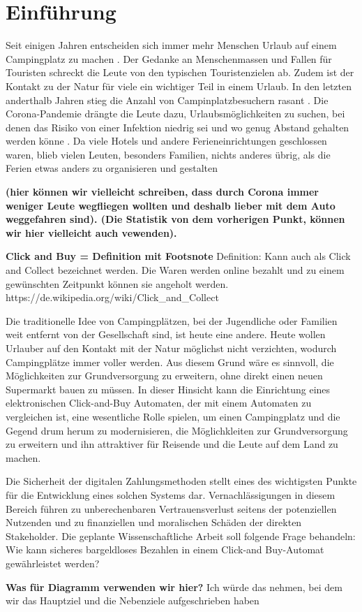 \section{Einführung}


Seit einigen Jahren entscheiden sich immer mehr Menschen Urlaub auf einem Campingplatz 
zu machen \cite{periodical:ANST}. Der Gedanke an Menschenmassen und Fallen für Touristen 
schreckt die Leute von den typischen Touristenzielen ab. Zudem ist der Kontakt zu der Natur für 
viele ein wichtiger Teil in einem Urlaub. In den letzten anderthalb Jahren stieg die Anzahl von
Campinplatzbesuchern rasant \cite{periodical:UBST}. Die Corona-Pandemie drängte die Leute dazu, 
Urlaubsmöglichkeiten zu suchen, bei denen das Risiko von einer Infektion niedrig sei und wo genug 
Abstand gehalten werden könne \cite{periodical:AUST}. Da viele Hotels und andere Ferieneinrichtungen 
geschlossen waren, blieb vielen Leuten, besonders Familien, nichts anderes übrig, als die Ferien 
etwas anders zu organisieren und gestalten 


\textbf{(hier können wir vielleicht schreiben, dass durch Corona immer weniger Leute wegfliegen wollten und deshalb lieber
mit dem Auto weggefahren sind). (Die Statistik von dem vorherigen Punkt, können wir hier vielleicht auch vewenden).}


\textbf{Click and Buy = Definition mit Footsnote}
Definition: Kann auch als Click and Collect bezeichnet werden. Die Waren werden online bezahlt und zu einem gewünschten Zeitpunkt 
können sie angeholt werden. https://de.wikipedia.org/wiki/Click_and_Collect


Die traditionelle Idee von Campingplätzen, bei der Jugendliche oder Familien weit entfernt von der 
Gesellschaft sind, ist heute eine andere. Heute wollen Urlauber auf den Kontakt mit der Natur
möglichst nicht verzichten, wodurch Campingplätze immer voller werden. Aus diesem Grund wäre es
sinnvoll, die Möglichkeiten zur Grundversorgung zu erweitern, ohne direkt einen neuen Supermarkt
bauen zu müssen. In dieser Hinsicht kann die Einrichtung eines elektronischen Click-and-Buy
Automaten, der mit einem Automaten zu vergleichen ist, eine wesentliche Rolle spielen, um 
einen Campingplatz und die Gegend drum herum zu modernisieren, die Möglichkleiten zur Grundversorgung 
zu erweitern und ihn attraktiver für Reisende und die Leute auf dem Land zu machen.

Die Sicherheit der digitalen Zahlungsmethoden stellt eines des wichtigsten Punkte für die Entwicklung
eines solchen Systems dar. Vernachlässigungen in diesem Bereich führen zu unberechenbaren Vertrauensverlust 
seitens der potenziellen Nutzenden und zu finanziellen und moralischen Schäden der direkten
Stakeholder. Die geplante Wissenschaftliche Arbeit soll folgende Frage behandeln:
Wie kann sicheres bargeldloses Bezahlen in einem Click-and Buy-Automat gewährleistet werden? 

\textbf{Was für Diagramm verwenden wir hier?}
Ich würde das nehmen, bei dem wir das Hauptziel und die Nebenziele aufgeschrieben haben